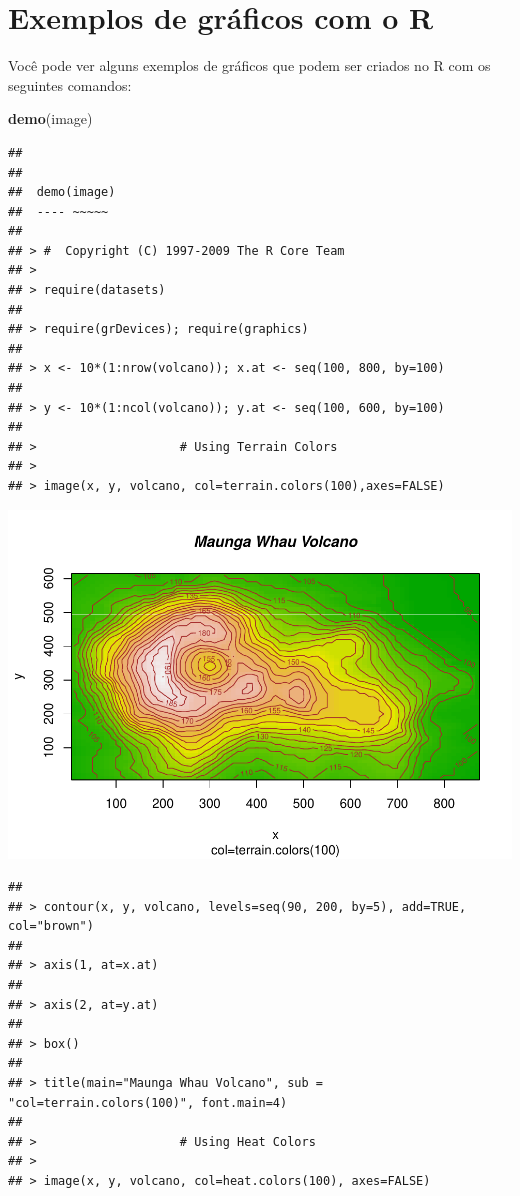 \documentclass[
]{book}
\newenvironment{Shaded}{\begin{snugshade}}{\end{snugshade}}
\newcommand{\KeywordTok}[1]{\textcolor[rgb]{0.13,0.29,0.53}{\textbf{#1}}}
\newcommand{\NormalTok}[1]{#1}
\begin{document}
\hypertarget{exemplos-de-gruxe1ficos-com-o-r}{%
\section{Exemplos de gráficos com o R}\label{exemplos-de-gruxe1ficos-com-o-r}}

Você pode ver alguns exemplos de gráficos que podem ser criados no R com os seguintes comandos:

\begin{Shaded}
\begin{Highlighting}[]
\KeywordTok{demo}\NormalTok{(image)}
\end{Highlighting}
\end{Shaded}

\begin{verbatim}
## 
## 
##  demo(image)
##  ---- ~~~~~
## 
## > #  Copyright (C) 1997-2009 The R Core Team
## > 
## > require(datasets)
## 
## > require(grDevices); require(graphics)
## 
## > x <- 10*(1:nrow(volcano)); x.at <- seq(100, 800, by=100)
## 
## > y <- 10*(1:ncol(volcano)); y.at <- seq(100, 600, by=100)
## 
## >                    # Using Terrain Colors
## > 
## > image(x, y, volcano, col=terrain.colors(100),axes=FALSE)
\end{verbatim}

\includegraphics{TudodoR_files/figure-latex/unnamed-chunk-145-1.pdf}

\begin{verbatim}
## 
## > contour(x, y, volcano, levels=seq(90, 200, by=5), add=TRUE, col="brown")
## 
## > axis(1, at=x.at)
## 
## > axis(2, at=y.at)
## 
## > box()
## 
## > title(main="Maunga Whau Volcano", sub = "col=terrain.colors(100)", font.main=4)
## 
## >                    # Using Heat Colors
## > 
## > image(x, y, volcano, col=heat.colors(100), axes=FALSE)
\end{verbatim}
\end{document}
